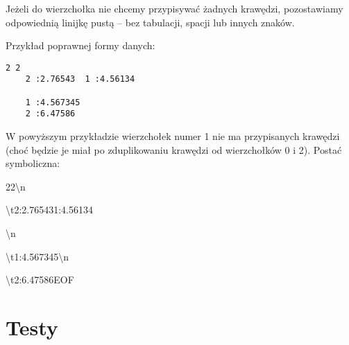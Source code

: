 \documentclass[]{article}
\begin{document}
Jeżeli do wierzchołka nie chcemy przypisywać żadnych krawędzi, pozostawiamy odpowiednią linijkę pustą – bez tabulacji, spacji lub innych znaków.

Przykład poprawnej formy danych:
\begin{verbatim}
2 2
    2 :2.76543  1 :4.56134

    1 :4.567345
    2 :6.47586
\end{verbatim}
W powyższym przykładzie wierzchołek numer 1 nie ma przypisanych krawędzi (choć będzie je miał po zduplikowaniu krawędzi od wierzchołków 0 i 2).
Postać symboliczna:

2\texttt{\verbvisiblespace}2\textbackslash n

\textbackslash t2\texttt{\verbvisiblespace}:2.76543\texttt{\verbvisiblespace}\texttt{\verbvisiblespace}1\texttt{\verbvisiblespace}:4.56134\n

\textbackslash n

\textbackslash t1\texttt{\verbvisiblespace}:4.567345\textbackslash n

\textbackslash t2\texttt{\verbvisiblespace}:6.47586EOF

\section{Testy}\label{header-n233}
\end{document}
